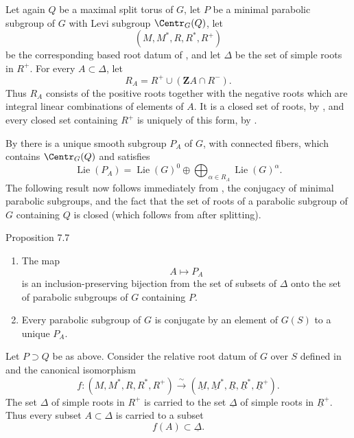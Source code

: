 
Let again \(Q\) be a maximal split torus of \(G\), let \(P\) be a
minimal parabolic subgroup of \(G\) with Levi subgroup
\(\Centr_G(Q)\), let
\[
 (M,M^*,R,R^*,R^+)
\]
be the corresponding based root datum of , and let \(\Delta\)
be the set of simple roots in \(R^+\).  For every
\(A\subset\Delta\), let
\[
 R_A=R^+\cup(\mathbf Z A\cap R^-).
\]
Thus \(R_A\) consists of the positive roots together with the
negative roots which are integral linear combinations of elements
of \(A\).  It is a closed set of roots, by , and
every closed set containing \(R^+\) is uniquely of this form, by
.

By  there is a unique smooth subgroup \(P_A\) of \(G\), with
connected fibers, which contains \(\Centr_G(Q)\) and satisfies
\[
 \operatorname{Lie}(P_A)
 =\operatorname{Lie}(G)^0
  \oplus\bigoplus_{\alpha\in R_A}\operatorname{Lie}(G)^\alpha.
\]
The following result now follows immediately from , the
conjugacy of minimal parabolic subgroups, and the fact that the set
of roots of a parabolic subgroup of \(G\) containing \(Q\) is
closed \textup{(which follows from  after splitting)}.

\begin{sgastatement}{Proposition 7.7}
\begin{enumerate}[label=\textup{(\roman*)}]
\item The map
\[
 A\longmapsto P_A
\]
is an inclusion-preserving bijection from the set of subsets of
\(\Delta\) onto the set of parabolic subgroups of \(G\) containing
\(P\).
\item Every parabolic subgroup of \(G\) is conjugate by an element
of \(G(S)\) to a unique \(P_A\).
\end{enumerate}
\end{sgastatement}


Let \(P\supset Q\) be as above.  Consider the relative root datum of
\(G\) over \(S\) defined in  and the canonical isomorphism
\[
 f:(M,M^*,R,R^*,R^+)
   \xrightarrow{\ \sim\ }
   (\underline M,\underline M^*,\underline R,
    \underline R^*,\underline R^+).
\]
The set \(\Delta\) of simple roots in \(R^+\) is carried to the set
\(\underline\Delta\) of simple roots in \(\underline R^+\).
Thus every subset \(A\subset\Delta\) is carried to a subset
\[
 f(A)\subset\underline\Delta.
\]

